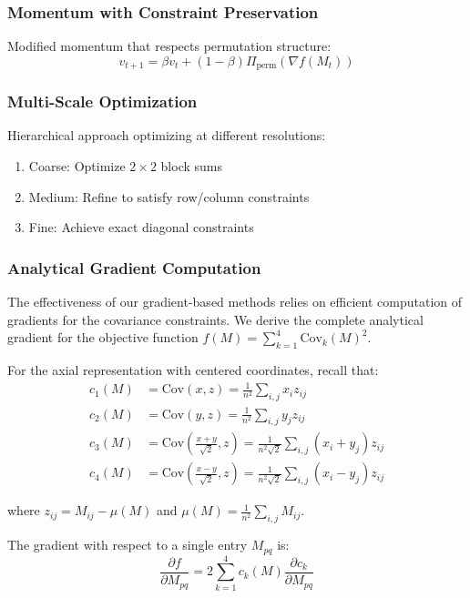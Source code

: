 \subsubsection{Momentum with Constraint Preservation}
Modified momentum that respects permutation structure:
\begin{equation}
v_{t+1} = \beta v_t + (1-\beta) \Pi_{\text{perm}}(\nabla f(M_t))
\end{equation}

\subsubsection{Multi-Scale Optimization}
Hierarchical approach optimizing at different resolutions:
\begin{enumerate}
    \item Coarse: Optimize $2 \times 2$ block sums
    \item Medium: Refine to satisfy row/column constraints
    \item Fine: Achieve exact diagonal constraints
\end{enumerate}

\subsubsection{Analytical Gradient Computation}

The effectiveness of our gradient-based methods relies on efficient computation of gradients for the covariance constraints. We derive the complete analytical gradient for the objective function $f(M) = \sum_{k=1}^4 \text{Cov}_k(M)^2$.

For the axial representation with centered coordinates, recall that:
\begin{align}
c_1(M) &= \text{Cov}(x, z) = \frac{1}{n^2}\sum_{i,j} x_i z_{ij} \\
c_2(M) &= \text{Cov}(y, z) = \frac{1}{n^2}\sum_{i,j} y_j z_{ij} \\
c_3(M) &= \text{Cov}\left(\frac{x+y}{\sqrt{2}}, z\right) = \frac{1}{n^2\sqrt{2}}\sum_{i,j} (x_i + y_j) z_{ij} \\
c_4(M) &= \text{Cov}\left(\frac{x-y}{\sqrt{2}}, z\right) = \frac{1}{n^2\sqrt{2}}\sum_{i,j} (x_i - y_j) z_{ij}
\end{align}

where $z_{ij} = M_{ij} - \mu(M)$ and $\mu(M) = \frac{1}{n^2}\sum_{i,j} M_{ij}$.

The gradient with respect to a single entry $M_{pq}$ is:
\begin{equation}
\frac{\partial f}{\partial M_{pq}} = 2\sum_{k=1}^4 c_k(M) \frac{\partial c_k}{\partial M_{pq}}
\end{equation}

